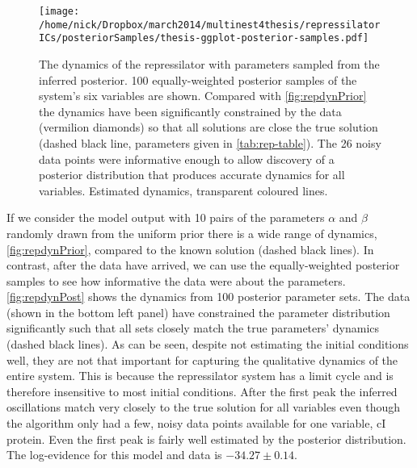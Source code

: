 \begin{figure*}[!htbp]
    \texttt{[image: /home/nick/Dropbox/march2014/multinest4thesis/repressilatorICs/posteriorSamples/thesis-ggplot-posterior-samples.pdf]}
  \caption{The dynamics of the repressilator with parameters sampled from the inferred posterior.
    100 equally-weighted posterior samples of the system's six variables are shown.
    Compared with \autoref{fig:repdynPrior} the dynamics have been significantly constrained by the data (vermilion diamonds) so that all solutions are close the true solution (dashed black line, parameters given in \autoref{tab:rep-table}).
    The 26 noisy data points were informative enough to allow discovery of a posterior distribution that produces accurate dynamics for all variables.
    Estimated dynamics, transparent coloured lines.
  }
  \label{fig:repdynPost}
\end{figure*}

If we consider the model output with 10 pairs of the parameters $\alpha$ and $\beta$ randomly drawn from the uniform prior there is a wide range of dynamics, \autoref{fig:repdynPrior}, compared to the known solution (dashed black lines).
In contrast, after the data have arrived, we can use the equally-weighted posterior samples to see how informative the data were about the parameters. 
\autoref{fig:repdynPost} shows the dynamics from 100 posterior parameter sets.
The data (shown in the bottom left panel) have constrained the parameter distribution significantly such that all sets closely match the true parameters' dynamics (dashed black lines).
As can be seen, despite not estimating the initial conditions well, they are not that important for capturing the qualitative dynamics of the entire system.
This is because the repressilator system has a limit cycle and is therefore insensitive to most initial conditions.
After the first peak the inferred oscillations match very closely to the true solution for all variables even though the algorithm only had a few, noisy data points available for one variable, cI protein.
Even the first peak is fairly well estimated by the posterior distribution.
The log-evidence for this model and data is $-34.27 \pm 0.14$.

